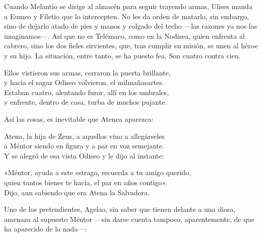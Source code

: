 Cuando Melantio se dirige al almacén para seguir trayendo armas, Ulises manda a Eumeo y Filetio que lo intercepten. No les da orden de matarlo, sin embargo, sino de dejarlo atado de pies y manos y colgado del techo ---las razones ya nos las imaginamos---. Así que no es Telémaco, como en la Nodisea, quien enfrenta al cabrero, sino los dos fieles sirvientes, que, tras cumplir su misión, se unen al héroe y su hijo. La situación, entre tanto, se ha puesto fea. Son cuatro contra cien.

\begin{versocita}
Ellos vistieron sus armas, cerraron la puerta brillante,\\
y hacia el sagaz Odiseo volvieron, el milmañasartes.\\
Estaban cuatro, alentando furor, allí en los umbrales,\\
y enfrente, dentro de casa, turba de muchos pujante.
\end{versocita}

Así las cosas, es inevitable que Atenea aparezca:

\begin{versocita}
Atena, la hija de Zeus, a aquellos vino a allegárseles\\
a Méntor siendo en figura y a par en voz semejante.\\
Y se alegró de esa vista Odiseo y le dijo al instante:
\end{versocita}

\begin{versocita}
«Méntor, ayuda a este estrago, recuerda a tu amigo querido,\\
quien tantos bienes te hacía, el par en años contigo».\\
Dijo, aun sabiendo que era Atena la Salvadora.
\end{versocita}

Uno de los pretendientes, Agelao, sin saber que tienen delante a una diosa, amenaza al supuesto Méntor ---sin darse cuenta tampoco, aparentemente, de que ha aparecido de la nada---:

